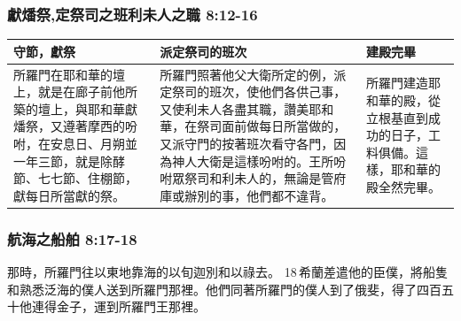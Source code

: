 \subsubsection{獻燔祭,定祭司之班利未人之職 8:12-16}
\begin{table}[H]
\centering 
\begin{tabular}{p{5.25cm}|p{8.5cm}|p{3cm}}\hline\hline
守節，獻祭&派定祭司的班次&建殿完畢\\\hline\hline
所羅門在耶和華的壇上，就是在廊子前他所築的壇上，與耶和華獻燔祭，又遵著摩西的吩咐，在安息日、月朔並一年三節，就是除酵節、七七節、住棚節，獻每日所當獻的祭。
&所羅門照著他父大衛所定的例，派定祭司的班次，使他們各供己事，又使利未人各盡其職，讚美耶和華，在祭司面前做每日所當做的，又派守門的按著班次看守各門，因為神人大衛是這樣吩咐的。王所吩咐眾祭司和利未人的，無論是管府庫或辦別的事，他們都不違背。
&所羅門建造耶和華的殿，從立根基直到成功的日子，工料俱備。這樣，耶和華的殿全然完畢。\\\hline
\end{tabular}
\end{table}


\subsubsection{航海之船舶 8:17-18}

那時，所羅門往以東地靠海的以旬迦別和以祿去。 18 希蘭差遣他的臣僕，將船隻和熟悉泛海的僕人送到所羅門那裡。他們同著所羅門的僕人到了俄斐，得了四百五十他連得金子，運到所羅門王那裡。

	 
